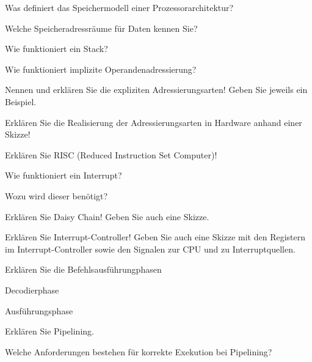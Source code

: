 \documentclass
[
  draft    = true,
  fontsize = 11pt,
  parskip  = half-,
  BCOR     = 0pt,
  DIV      = 11,
  ngerman,
  dvipsnames
]
{scrartcl}
\begin{document}
\begin{mytemize}
  \item Was definiert das Speichermodell einer Prozessorarchitektur?
  \item Welche Speicheradressräume für Daten kennen Sie?
  \item Wie funktioniert ein Stack?
  \item Wie funktioniert implizite Operandenadressierung?
  \item Nennen und erklären Sie die expliziten Adressierungsarten! Geben Sie jeweils ein Beispiel.
  \item Erklären Sie die Realisierung der Adressierungsarten in Hardware anhand einer Skizze!
  \item Erklären Sie RISC (Reduced Instruction Set Computer)!
  \item Wie funktioniert ein Interrupt?
        \begin{mytemize}
          \item Wozu wird dieser benötigt?
        \end{mytemize}
  \item Erklären Sie Daisy Chain! Geben Sie auch eine Skizze.
  \item Erklären Sie Interrupt-Controller! Geben Sie auch eine Skizze mit den Registern im Interrupt-Controller sowie den Signalen zur CPU und zu Interruptquellen.
  \item Erklären Sie die Befehlsausführungphasen
        \begin{mytemize}
          \item \glqq{}Decodierphase\grqq
          \item \glqq{}Ausführungsphase\grqq
        \end{mytemize}
  \item Erklären Sie Pipelining.
        \begin{mytemize}
          \item Welche Anforderungen bestehen für korrekte Exekution bei Pipelining?
        \end{mytemize}
\end{mytemize}

\end{document}
